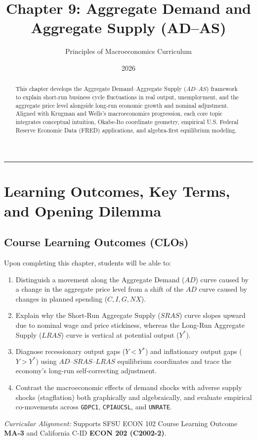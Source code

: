 \documentclass[11pt,letterpaper]{article}
\begin{document}
\title{\Huge\bfseries\color{SlateBlue} Chapter 9: Aggregate Demand and Aggregate Supply (AD--AS)}
\author{\large Principles of Macroeconomics Curriculum}
\date{2026}
\maketitle

\thispagestyle{plain}

\begin{abstract}
This chapter develops the Aggregate Demand--Aggregate Supply ($AD\text{--}AS$) framework to explain short-run business cycle fluctuations in real output, unemployment, and the aggregate price level alongside long-run economic growth and nominal adjustment. Aligned with Krugman and Wells's macroeconomics progression, each core topic integrates conceptual intuition, Okabe-Ito coordinate geometry, empirical U.S. Federal Reserve Economic Data (FRED) applications, and algebra-first equilibrium modeling.
\end{abstract}

\tableofcontents
\vspace{1.5em}
\hrule
\vspace{1.5em}

\section{Learning Outcomes, Key Terms, and Opening Dilemma}

\subsection*{Course Learning Outcomes (CLOs)}
Upon completing this chapter, students will be able to:
\begin{enumerate}
    \item Distinguish a movement along the Aggregate Demand ($AD$) curve caused by a change in the aggregate price level from a shift of the $AD$ curve caused by changes in planned spending ($C, I, G, NX$).
    \item Explain why the Short-Run Aggregate Supply ($SRAS$) curve slopes upward due to nominal wage and price stickiness, whereas the Long-Run Aggregate Supply ($LRAS$) curve is vertical at potential output ($Y^*$).
    \item Diagnose recessionary output gaps ($Y < Y^*$) and inflationary output gaps ($Y > Y^*$) using $AD\text{--}SRAS\text{--}LRAS$ equilibrium coordinates and trace the economy's long-run self-correcting adjustment.
    \item Contrast the macroeconomic effects of demand shocks with adverse supply shocks (stagflation) both graphically and algebraically, and evaluate empirical co-movements across \texttt{GDPC1}, \texttt{CPIAUCSL}, and \texttt{UNRATE}.
\end{enumerate}
\noindent\textit{Curricular Alignment:} Supports SFSU ECON 102 Course Learning Outcome \textbf{MA-3} and California C-ID \textbf{ECON 202 (C2002-2)}.
\end{document}
